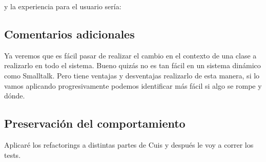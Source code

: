 
y la experiencia para el usuario sería:


\subsection{Comentarios adicionales}
Ya veremos que es fácil pasar de realizar el cambio en el contexto de una clase a realizarlo en todo
el sistema. Bueno quizás no es tan fácil en un sistema dinámico como Smalltalk. Pero tiene ventajas
y desventajas realizarlo de esta manera, si lo vamos aplicando progresivamente podemos identificar
más fácil si algo se rompe y dónde.



\subsection{Preservación del comportamiento}

Aplicaré los refactorings a distintas partes de Cuis y después le voy a correr los tests.